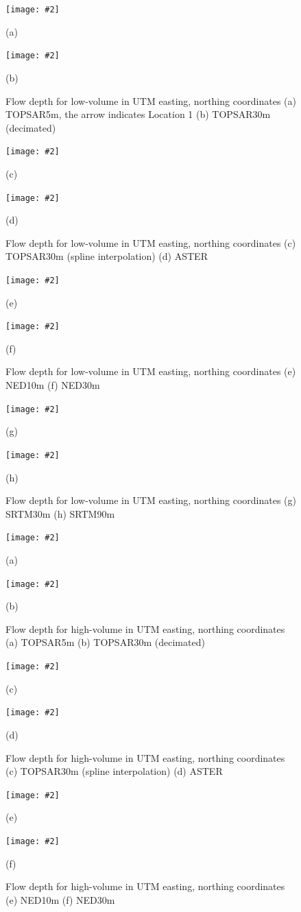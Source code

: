 \documentclass[12pt,letterpaper]{article}
\newcommand{\Pic}[2][0.85]{\begin{center}\texttt{[image: \#2]}
 \end{center} }
\begin{document}
\begin{figure}[H]
   \centering 
    \Pic[0.9]{low_pics/Arrow.jpg}
   (a) 
  \Pic[0.9]{low_pics/Mammoth30_3.jpg} 
  (b)
  \caption{Flow depth for low-volume in UTM easting, northing coordinates (a) TOPSAR5m, the arrow indicates Location
    1 (b) TOPSAR30m (decimated) }
  \label{fig2}
\end{figure}

\begin{figure}[H]
  \ContinuedFloat 
 \centering
  \Pic[0.9]{low_pics/Mammoth30_low} 
  (c)
   \Pic[0.9]{low_pics/ASTER.jpg}
  (d)
  \caption{Flow depth for low-volume in UTM easting, northing coordinates (c) TOPSAR30m (spline interpolation) (d)
    ASTER }
  \label{fig3}
\end{figure}

\begin{figure}[H]
  \ContinuedFloat 
 \centering
  \Pic[0.9]{low_pics/ned10_low.jpg}
   (e)
  \Pic[0.9]{low_pics/ned30_low.jpg}
   (f)
  \caption{Flow depth for low-volume in UTM easting, northing coordinates (e) NED10m (f) NED30m}
  \label{fig4}
\end{figure}

\begin{figure}[H]
  \ContinuedFloat 
 \centering
  \Pic[0.9]{low_pics/srtm30.jpg} 
  (g) 
  \Pic[0.9]{low_pics/srtm90.jpg}
  (h)
  \caption{Flow depth for low-volume in UTM easting, northing coordinates (g) SRTM30m (h) SRTM90m}
  \label{fig5}
\end{figure}
   

\begin{figure}[H]
  \centering 
  \Pic[0.9]{High_pics/Mammoth_high.jpg}
  (a) 
  \Pic[0.9]{High_pics/Mammoth30_3.jpg} 
  (b)
  \caption{Flow depth for high-volume in UTM easting, northing coordinates (a) TOPSAR5m (b) TOPSAR30m (decimated) }
  \label{fig6}
\end{figure}

\begin{figure}[H]
  \ContinuedFloat 
 \centering
  \Pic[0.9]{High_pics/Mammoth30_high}
   (c)
  \Pic[0.9]{High_pics/ASTER.jpg}
   (d)
  \caption{Flow depth for high-volume in UTM easting, northing coordinates (c) TOPSAR30m (spline interpolation) (d)
    ASTER }
  \label{fig7}
\end{figure}

\begin{figure}[H]
  \ContinuedFloat 
 \centering
  \Pic[0.9]{High_pics/ned10.jpg} 
  (e) \Pic[0.9]{High_pics/ned30.jpg}
  (f)
  \caption{Flow depth for high-volume in UTM easting, northing coordinates (e) NED10m (f) NED30m}
  \label{fig8}
\end{figure}
\end{document}
